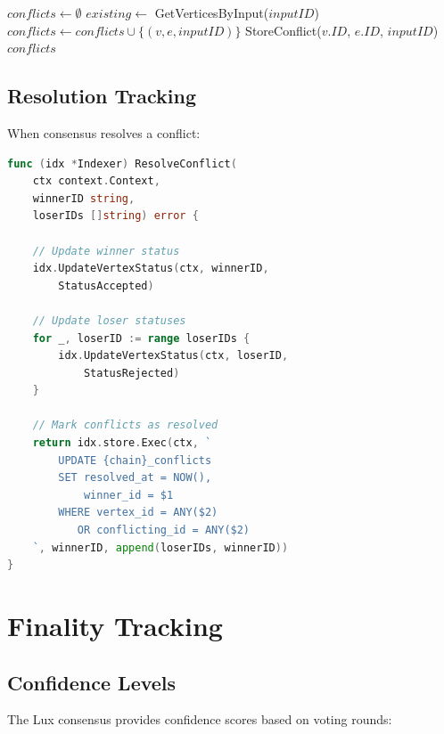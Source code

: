 \documentclass[11pt,twocolumn]{article}
\begin{document}
\begin{algorithm}
\caption{Conflict Detection}
\begin{algorithmic}[1]
    \State $conflicts \gets \emptyset$
        \State $existing \gets$ GetVerticesByInput($inputID$)
                \State $conflicts \gets conflicts \cup \{(v, e, inputID)\}$
                \State StoreConflict($v.ID$, $e.ID$, $inputID$)
            \EndIf
        \EndFor
    \EndFor
    \State \Return $conflicts$
\EndProcedure
\end{algorithmic}
\end{algorithm}

\subsection{Resolution Tracking}

When consensus resolves a conflict:

\begin{lstlisting}[language=Go,caption={Conflict resolution handler}]
func (idx *Indexer) ResolveConflict(
    ctx context.Context,
    winnerID string,
    loserIDs []string) error {

    // Update winner status
    idx.UpdateVertexStatus(ctx, winnerID,
        StatusAccepted)

    // Update loser statuses
    for _, loserID := range loserIDs {
        idx.UpdateVertexStatus(ctx, loserID,
            StatusRejected)
    }

    // Mark conflicts as resolved
    return idx.store.Exec(ctx, `
        UPDATE {chain}_conflicts
        SET resolved_at = NOW(),
            winner_id = $1
        WHERE vertex_id = ANY($2)
           OR conflicting_id = ANY($2)
    `, winnerID, append(loserIDs, winnerID))
}
\end{lstlisting}

\section{Finality Tracking}

\subsection{Confidence Levels}

The Lux consensus provides confidence scores based on voting rounds:
\end{document}

